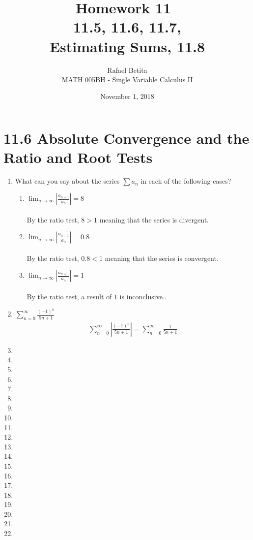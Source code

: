 \documentclass[12pt]{article}
\title{Homework 11\
\\11.5, 11.6, 11.7, \\Estimating Sums, 11.8}
\author{Rafael Betita\\
MATH 005BH - Single Variable Calculus II}
\date{November 1, 2018}
\begin{document}
\maketitle

\newpage\section{11.6 Absolute Convergence and the Ratio and Root Tests}
\begin{enumerate}
    \item What can you say about the series $\sum a_n$ in each of the following cases?
    \begin{enumerate}
        \item $\lim_{n\to\infty} \left|\frac{a_{n+1}}{a_n}\right| = 8$
        \\\\ By the ratio test, $8 > 1$ meaning that the series is divergent. 
        \item $\lim_{n\to\infty} \left|\frac{a_{n+1}}{a_n}\right| = 0.8$
        \\\\ By the ratio test, $0.8 < 1$ meaning that the series is convergent.
        \item $\lim_{n\to\infty} \left|\frac{a_{n+1}}{a_n}\right| = 1$
        \\\\ By the ratio test, a result of $1$ is inconclusive..
    \end{enumerate}
    \addtocounter{enumi}{1}\item $\sum^\infty_{n=0}\frac{(-1)^n}{5n+1}$
    \begin{gather*}
        \sum^\infty_{n=0}\left|\frac{(-1)^n}{5n+1}\right|=\sum^\infty_{n=0}\frac{1}{5n+1}
    \end{gather*}
    \addtocounter{enumi}{1}\item
    \addtocounter{enumi}{1}\item
    \addtocounter{enumi}{1}\item
    \addtocounter{enumi}{1}\item
    \addtocounter{enumi}{1}\item
    \addtocounter{enumi}{1}\item
    \addtocounter{enumi}{1}\item
    \addtocounter{enumi}{1}\item
    \addtocounter{enumi}{1}\item
    \addtocounter{enumi}{1}\item
    \addtocounter{enumi}{1}\item
    \addtocounter{enumi}{1}\item
    \addtocounter{enumi}{1}\item
    \addtocounter{enumi}{1}\item
    \addtocounter{enumi}{1}\item
    \addtocounter{enumi}{1}\item
    \addtocounter{enumi}{3}\item
    \addtocounter{enumi}{1}\item
    \addtocounter{enumi}{1}\item
    \addtocounter{enumi}{1}\item
\end{enumerate}
\end{document}
